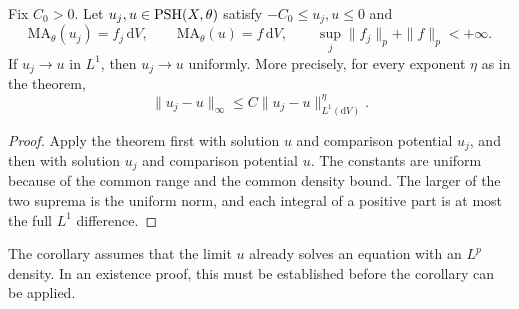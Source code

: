 \begin{corollary}\label{cor:bounded-stability-uniform-convergence}
Fix $C_0>0$. Let $u_j,u\in\mathrm{PSH}(X,\theta)$ satisfy $-C_0\leq u_j,u\leq0$ and
\[
 \mathrm{MA}_\theta(u_j)=f_j\,\mathrm{d}V,\qquad
 \mathrm{MA}_\theta(u)=f\,\mathrm{d}V,
 \qquad \sup_j\|f_j\|_p+\|f\|_p<+\infty.
\]
If $u_j\to u$ in $L^1$, then $u_j\to u$ uniformly. More precisely, for every exponent $\eta$ as in the theorem,
\[
 \|u_j-u\|_\infty\leq C\|u_j-u\|_{L^1(\mathrm{d}V)}^\eta.
\]
\end{corollary}
\begin{proof}
Apply the theorem first with solution $u$ and comparison potential $u_j$, and then with solution $u_j$ and comparison potential $u$. The constants are uniform because of the common range and the common density bound. The larger of the two suprema is the uniform norm, and each integral of a positive part is at most the full $L^1$ difference.
\end{proof}

The corollary assumes that the limit $u$ already solves an equation with an $L^p$ density. In an existence proof, this must be established before the corollary can be applied.
